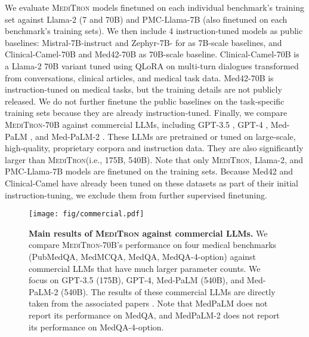 \documentclass{article}
\newcommand{\llama}{\textnormal{Llama}}
\newcommand{\mtron}{\textsc{MediTron}\xspace}
\newcommand{\mtronb}{\textsc{MediTron-70B}\xspace}
\begin{document}
We evaluate \mtron models finetuned on each individual benchmark's training set against \llama-2 (7 and 70B) and PMC-\llama-7B (also finetuned on each benchmark's training sets). We then include 4 instruction-tuned models as public baselines: Mistral-7B-instruct \citep{jiang2023mistral} and Zephyr-7B- \citep{tunstall2023zephyr} for as 7B-scale baselines, and Clinical-Camel-70B \citep{toma2023clinical} and Med42-70B \citep{med42} as 70B-scale baseline. Clinical-Camel-70B is a \llama-2 70B variant tuned using QLoRA \citep{dettmers2023qlora} on multi-turn dialogues transformed from conversations, clinical articles, and medical task data. Med42-70B is instruction-tuned on medical tasks, but the training details are not publicly released. We do not further finetune the public baselines on the task-specific training sets because they are already instruction-tuned. Finally, we compare \mtronb against commercial LLMs, including GPT-3.5 \citep{ouyang2022training}, GPT-4 \citep{openai2023gpt4}, Med-PaLM \citep{medpalm}, and Med-PaLM-2 \citep{medpalm2}. These LLMs are pretrained or tuned on large-scale, high-quality, proprietary corpora and instruction data. They are also significantly larger than \mtron (i.e., 175B, 540B). Note that only \mtron, \llama-2, and PMC-\llama-7B models are finetuned on the training sets. Because Med42 \citep{med42} and Clinical-Camel \citep{toma2023clinical} have already been tuned on these datasets as part of their initial instruction-tuning, we exclude them from further supervised finetuning. 

\begin{figure}[t]
    \centering
    \texttt{[image: fig/commercial.pdf]}
    \caption{\textbf{Main results of \mtron against commercial LLMs.} We compare \mtronb's performance on four medical benchmarks (PubMedQA, MedMCQA, MedQA, MedQA-4-option) against commercial LLMs that have much larger parameter counts. We focus on GPT-3.5 (175B), GPT-4, Med-PaLM (540B), and Med-PaLM-2 (540B). The results of these commercial LLMs are directly taken from the associated papers \citep{nori2023capabilities, medpalm, medpalm2}. Note that MedPaLM does not report its performance on MedQA, and MedPaLM-2 does not report its performance on MedQA-4-option.}
    \label{fig:commercial}
\end{figure}
\end{document}
